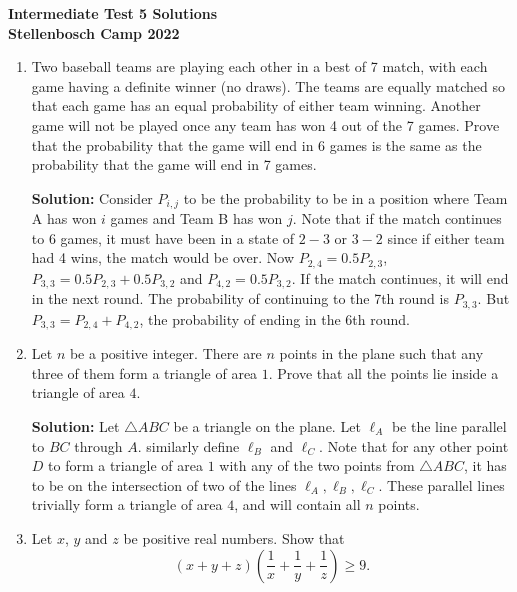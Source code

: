 \documentclass{article}
\begin{document}
\thispagestyle{empty}

\begin{center} \bfseries
  \Large Intermediate Test 5 Solutions
  \\ \vspace{12pt}
  \large Stellenbosch Camp 2022
\end{center}

\bigskip \bigskip

\begin{enumerate}[itemsep=24pt]

\item %
Two baseball teams are playing each other in a best of 7 match, with each game having a definite winner (no draws). The teams are equally matched so that each game has an equal probability of either team winning. Another game will not be played once any team has won 4 out of the 7 games. Prove that the probability that the game will end in 6 games is the same as the probability that the game will end in 7 games.

\textbf{Solution:} Consider $P_{i,j}$ to be the probability to be in a position where Team A has won $i$ games and Team B has won $j$. Note that if the match continues to 6 games, it must have been in a state of $2-3$ or $3-2$ since if either team had 4 wins, the match would be over. Now $P_{2,4} = 0.5P_{2,3}$, $P_{3,3} = 0.5P_{2,3}+0.5P_{3,2}$ and $P_{4,2} = 0.5P_{3,2}$. If the match continues, it will end in the next round. The probability of continuing to the 7th round is $P_{3,3}$. But $P_{3,3}=P_{2,4}+P_{4,2}$, the probability of ending in the 6th round.


\item %
Let $n$ be a positive integer. There are $n$ points in the plane such that any three of them form a triangle of area $1$. Prove that all the points lie inside a triangle of area $4$. 

\textbf{Solution:}
Let $\triangle ABC$ be a triangle on the plane. Let $\ell_A$ be the line parallel to $BC$ through $A$. similarly define $\ell_B$ and $\ell_C$. Note that for any other point $D$ to form a triangle of area $1$ with any of the two points from $\triangle ABC$, it has to be on the intersection of two of the lines $\ell_A, \ell_B, \ell_C$. These parallel lines trivially form a triangle of area $4$, and will contain all $n$ points.

\item %
Let $x$, $y$ and $z$ be positive real numbers. Show that 
$$ (x+y+z)\left(\frac{1}{x}+\frac{1}{y}+\frac{1}{z}\right) \geq 9. $$


\end{enumerate}
\end{document}
